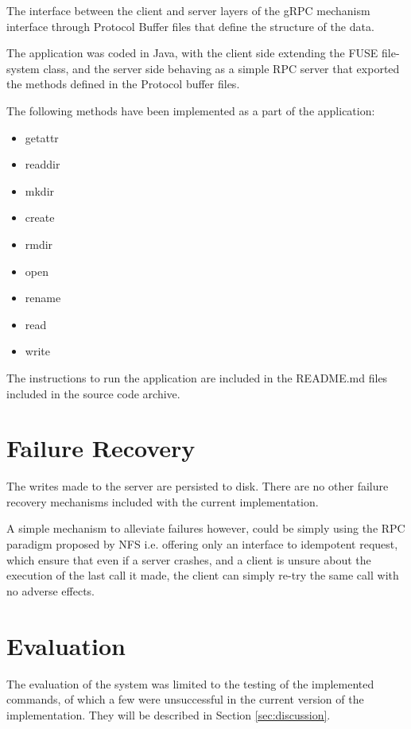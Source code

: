 \documentclass[a4paper]{article}
\begin{document}
The interface between the client and server layers of the gRPC mechanism interface through Protocol Buffer\cite{Protocol27:online} files that define the structure of the data.

The application was coded in Java, with the client side extending the FUSE file-system class, and the server side behaving as a simple RPC server that exported the methods defined in the Protocol buffer files.

The following methods have been implemented as a part of the application:
\begin{itemize}
    \item 
    getattr
    \item
    readdir
    \item
    mkdir
    \item
    create
    \item
    rmdir
    \item
    open
    \item
    rename
    \item 
    read
    \item 
    write
\end{itemize}

The instructions to run the application are included in the README.md files included in the source code archive.

\section{Failure Recovery} \label{sec:failure-recovery}
The writes made to the server are persisted to disk. There are no other failure recovery mechanisms included with the current implementation.

A simple mechanism to alleviate failures however, could be simply using the RPC paradigm proposed by NFS i.e. offering only an interface to idempotent request, which ensure that even if a server crashes, and a client is unsure about the execution of the last call it made, the client can simply re-try the same call with no adverse effects.

\section{Evaluation} \label{sec:evaluation}
The evaluation of the system was limited to the testing of the implemented commands, of which a few were unsuccessful in the current version of the implementation. They will be described in Section \ref{sec:discussion}.
\end{document}
